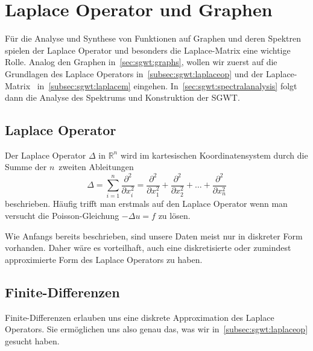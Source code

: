 
\section{Laplace Operator und Graphen\label{sec:sgwt:laplace}}

F\"ur die Analyse und Synthese von Funktionen auf Graphen und deren Spektren 
spielen der Laplace Operator und besonders die Laplace-Matrix eine wichtige 
Rolle. Analog den Graphen in~\cref{sec:sgwt:graphs}, wollen wir zuerst 
auf die Grundlagen des Laplace Operators in~\cref{subsec:sgwt:laplaceop} und 
der Laplace-Matrix~\laplaceL{} in~\cref{subsec:sgwt:laplacem} eingehen. 
In~\cref{sec:sgwt:spectralanalysis} folgt dann die Analyse des Spektrums und 
Konstruktion der SGWT.

\subsection{Laplace Operator\label{subsec:sgwt:laplaceop}}

Der Laplace Operator $\Delta$ in $\mathbb{R}^n$ wird im kartesischen 
Koordinatensystem durch die Summe der $n$~zweiten Ableitungen
\begin{equation*}
\Delta = 
\sum_{i = 1}^{n}\frac{\partial^2}{\partial x_i^2}
=
\frac{\partial^2}{\partial x_1^2}
+ \frac{\partial^2}{\partial x_2^2}
+ \dots
+ \frac{\partial^2}{\partial x_n^2}
\end{equation*}
beschrieben. H\"aufig trifft man erstmals auf den Laplace Operator wenn man 
versucht die Poisson-Gleichung $-\Delta u = f$ zu l\"osen.

Wie Anfangs bereits beschrieben, sind unsere Daten meist nur in diskreter Form 
vorhanden. Daher w\"are es vorteilhaft, auch eine diskretisierte oder zumindest 
approximierte Form des Laplace Operators zu haben.

\subsection{Finite-Differenzen\label{subsec:sgwt:finitediff}}

Finite-Differenzen erlauben uns eine diskrete Approximation des 
Laplace Operators. Sie erm\"oglichen uns also genau das, was wir 
in~\cref{subsec:sgwt:laplaceop} gesucht haben.

